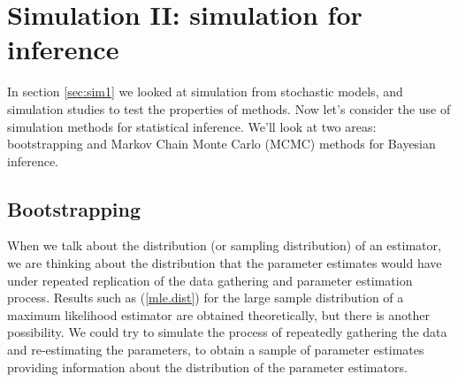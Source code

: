 \documentclass[10pt] {article}
\theoremstyle{definition}
\begin{document}
\pagebreak

\section{Simulation II: simulation for inference}

In section \ref{sec:sim1} we looked at simulation from stochastic models, and simulation studies to test the properties of methods. Now let's consider the use of simulation methods for statistical inference. We'll look at two areas: bootstrapping and Markov Chain Monte Carlo (MCMC) methods for Bayesian inference.

\subsection{Bootstrapping}

When we talk about the distribution (or sampling distribution) of an estimator, we are thinking about the distribution that the parameter estimates would have under repeated replication of the data gathering and parameter estimation process. Results such as (\ref{mle.dist}) for the large sample distribution of a maximum likelihood estimator are obtained theoretically, but there is another possibility. We could try to simulate the process of repeatedly gathering the data and re-estimating the parameters, to obtain a sample of parameter estimates providing information about the distribution of the parameter estimators. 
\end{document}
